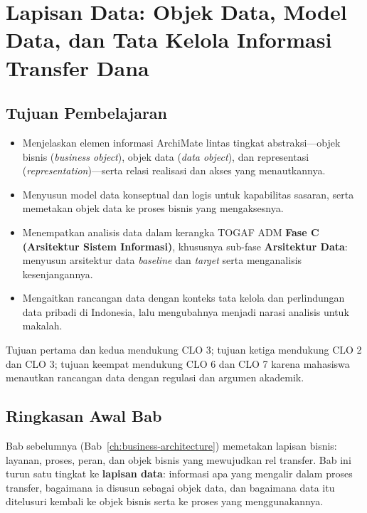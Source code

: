 \chapter[Lapisan Data: Objek Data, Model Data, dan Tata Kelola Informasi]{Lapisan
Data: Objek Data, Model Data, dan Tata Kelola Informasi Transfer Dana}
\label{ch:data-architecture}
\setlength{\emergencystretch}{2em}

\section*{Tujuan Pembelajaran}
\begin{itemize}
  \item Menjelaskan elemen informasi ArchiMate lintas tingkat abstraksi---objek
        bisnis (\emph{business object}), objek data (\emph{data object}), dan
        representasi (\emph{representation})---serta relasi realisasi dan akses
        yang menautkannya.
  \item Menyusun model data konseptual dan logis untuk kapabilitas sasaran, serta
        memetakan objek data ke proses bisnis yang mengaksesnya.
  \item Menempatkan analisis data dalam kerangka TOGAF ADM \textbf{Fase C
        (Arsitektur Sistem Informasi)}, khususnya sub-fase \textbf{Arsitektur
        Data}: menyusun arsitektur data \emph{baseline} dan \emph{target} serta
        menganalisis kesenjangannya.
  \item Mengaitkan rancangan data dengan konteks tata kelola dan perlindungan
        data pribadi di Indonesia, lalu mengubahnya menjadi narasi analisis untuk
        makalah.
\end{itemize}

Tujuan pertama dan kedua mendukung CLO 3; tujuan ketiga mendukung CLO 2 dan
CLO 3; tujuan keempat mendukung CLO 6 dan CLO 7 karena mahasiswa menautkan
rancangan data dengan regulasi dan argumen akademik.

\section{Ringkasan Awal Bab}

Bab sebelumnya (Bab~\ref{ch:business-architecture}) memetakan lapisan bisnis:
layanan, proses, peran, dan objek bisnis yang mewujudkan rel transfer. Bab ini
turun satu tingkat ke \textbf{lapisan data}: informasi apa yang mengalir dalam
proses transfer, bagaimana ia disusun sebagai objek data, dan bagaimana data itu
ditelusuri kembali ke objek bisnis serta ke proses yang menggunakannya.

